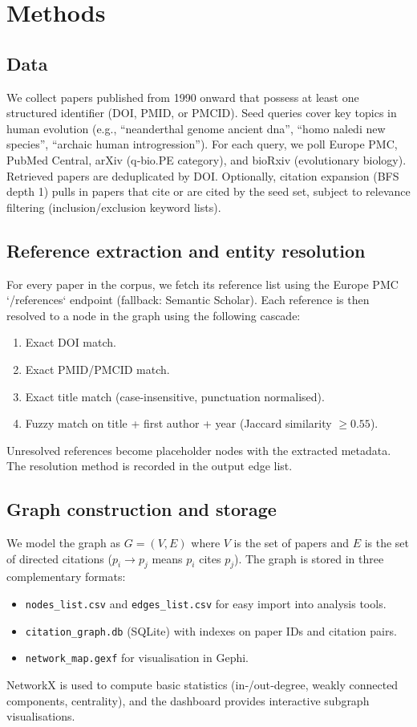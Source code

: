\section{Methods}
\subsection{Data}
We collect papers published from 1990 onward that possess at least one structured identifier (DOI, PMID, or PMCID). Seed queries cover key topics in human evolution (e.g., ``neanderthal genome ancient dna'', ``homo naledi new species'', ``archaic human introgression''). For each query, we poll Europe PMC, PubMed Central, arXiv (q‑bio.PE category), and bioRxiv (evolutionary biology). Retrieved papers are deduplicated by DOI. Optionally, citation expansion (BFS depth 1) pulls in papers that cite or are cited by the seed set, subject to relevance filtering (inclusion/exclusion keyword lists).

\subsection{Reference extraction and entity resolution}
For every paper in the corpus, we fetch its reference list using the Europe PMC `/references` endpoint (fallback: Semantic Scholar). Each reference is then resolved to a node in the graph using the following cascade:
\begin{enumerate}
    \item Exact DOI match.
    \item Exact PMID/PMCID match.
    \item Exact title match (case‑insensitive, punctuation normalised).
    \item Fuzzy match on title + first author + year (Jaccard similarity $\ge 0.55$).
\end{enumerate}
Unresolved references become placeholder nodes with the extracted metadata. The resolution method is recorded in the output edge list.

\subsection{Graph construction and storage}
We model the graph as $G = (V, E)$ where $V$ is the set of papers and $E$ is the set of directed citations ($p_i \rightarrow p_j$ means $p_i$ cites $p_j$). The graph is stored in three complementary formats:
\begin{itemize}
    \item \texttt{nodes\_list.csv} and \texttt{edges\_list.csv} for easy import into analysis tools.
    \item \texttt{citation\_graph.db} (SQLite) with indexes on paper IDs and citation pairs.
    \item \texttt{network\_map.gexf} for visualisation in Gephi.
\end{itemize}
NetworkX is used to compute basic statistics (in‑/out‑degree, weakly connected components, centrality), and the dashboard provides interactive subgraph visualisations.

